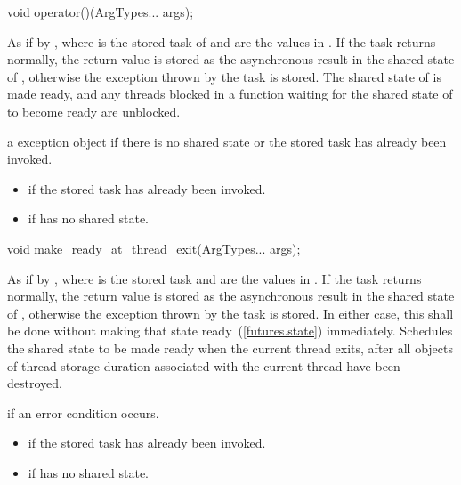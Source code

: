 %
%
\begin{itemdecl}
void operator()(ArgTypes... args);
\end{itemdecl}

\begin{itemdescr}
\pnum
\effects As if by ,
where  is the
stored task of  and
 are the values in . If the task returns normally,
the return value is stored as the asynchronous result in the shared state of
, otherwise the exception thrown by the task is stored. The
shared state of  is made ready, and any threads blocked in a
function waiting for
the shared state of  to become ready are unblocked.

\pnum
\throws a  exception object if there is no shared
state or the stored task has already been invoked.

\pnum
\errors
\begin{itemize}
\item {} if
the stored task has already been invoked.
\item {} if  has no shared state.
\end{itemize}
\end{itemdescr}

%
%
\begin{itemdecl}
void make_ready_at_thread_exit(ArgTypes... args);
\end{itemdecl}

\begin{itemdescr}
\pnum
\effects As if by ,
where  is the stored task and
 are the values in . If the task returns normally,
the return value is stored as the asynchronous result in the shared state of
, otherwise the exception thrown by the task is stored. In either
case, this shall be done without making that state ready~(\ref{futures.state}) immediately. Schedules
the shared state to be made ready when the current thread exits,
after all objects of thread storage duration associated with the current thread
have been destroyed.

\pnum
\throws {} if an error condition occurs.

\pnum
\errors
\begin{itemize}
\item {} if the
stored task has already been invoked.
\item {} if  has no shared state.
\end{itemize}
\end{itemdescr}

